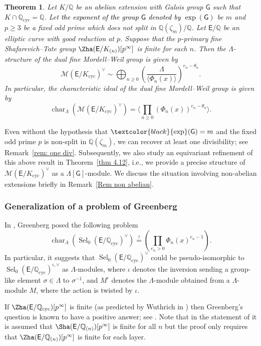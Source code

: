 \documentclass{amsart}
\newcommand{\edit}[1]{\textcolor{black}{#1}}
\numberwithin{equation}{section}
\newtheorem{lthm}{Theorem}
\theoremstyle{remark}
\newcommand{\EC}{\mathsf{E}}
\newcommand{\cM}{\mathcal{M}}
\newcommand{\sG}{\mathsf{G}}
\newcommand{\Q}{\mathbb{Q}}
\newcommand{\cyc}{\operatorname{{cyc}}}
\newcommand{\Sel}{\operatorname{Sel}}
\newcommand{\charac}{\operatorname{char}}
\renewcommand{\exp}{\operatorname{exp}}
\theoremstyle{plain} %
\begin{document}
\begin{lthm}
\label{thm A}
Let $K/\Q$ be an abelian extension with Galois group $\sG$ such that $K \cap \Q_{\cyc}= \Q$.
Let \edit{the exponent of the group $\sG$ denoted by $\exp(\sG)$} be $m$ and $p\geq 3$ be a fixed odd prime which does not split in $\Q(\zeta_m)/\Q$.
Let $\EC/\Q$ be an elliptic curve with good reduction at $p$.
Suppose that the $p$-primary fine Shafarevich--Tate group $\Zha(\EC/K_{(n)})[p^\infty]$ is finite for each $n$.
Then the $\Lambda$-structure of the dual fine Mordell--Weil group is given by
\[
\cM(\EC/K_{\cyc})^\vee \sim \bigoplus_{n\geq 0} \left(\frac{\Lambda}{\langle\Phi_n(x)\rangle}\right)^{e_n - \theta_n}.
\]
In particular, the characteristic ideal of the dual fine Mordell--Weil group is given by
\[
\charac_{\Lambda}(\cM(\EC/K_{\cyc})^\vee) = \Bigg\langle\prod_{n\geq 0} (\Phi_n(x))^{e_n -\theta_n} \Bigg\rangle.
\]
\end{lthm}

Even without the hypothesis that $\edit{\exp}(\mathsf{G})=m$ and the fixed odd prime $p$ is non-split in $\Q(\zeta_m)$, we can recover at least one divisibility; see Remark~\ref{rem: one div}.
Subsequently, we also study an equivariant refinement of this above result in Theorem~\ref{thm 4.12}, i.e., we provide a precise structure of $\cM(\EC/K_{\cyc})^\vee$ as a $\Lambda[\sG]$-module.
We discuss the situation involving non-abelian extensions briefly in Remark~\ref{Rem non abelian}.

\subsubsection*{Generalization of a problem of Greenberg}
In \cite[Problem~0.7]{KP07}, Greenberg posed the following problem 
\begin{equation}
\label{Gr}\tag{Gr}
\charac_\Lambda(\Sel_0(\EC/\Q_{\cyc})^\vee)\stackrel{?}{=}\left(\prod_{e_n>0}\Phi_n(x)^{e_n-1}\right).
\end{equation}
In particular, it suggests that $\Sel_0(\EC/\Q_{\cyc})^\vee$ could be pseudo-isomorphic to $\Sel_0(\EC/\Q_{\cyc})^{\iota,\vee}$ as $\Lambda$-modules, where $\iota$ denotes the inversion sending a group-like element $\sigma\in\Lambda$ to $\sigma^{-1}$, and $M^\iota$ denotes the $\Lambda$-module obtained from a $\Lambda$-module $M$, where the action is twisted by $\iota$.

If $\Zha(\EC/\Q_{\cyc})[p^\infty]$ is finite (as predicted by Wuthrich in \cite[Conjecture~8.2]{Wut07}) %
then Greenberg's question is known to have a positive answer; see \cite[Theorem~C]{Lei23}.
Note that in the statement of \cite[Theorem~C]{Lei23} it is assumed that $\Sha(\EC/\Q_{(n)})[p^\infty]$ is finite for all $n$ but the proof only requires that $\Zha(\EC/\Q_{(n)})[p^\infty]$ is finite for each layer.
\end{document}
